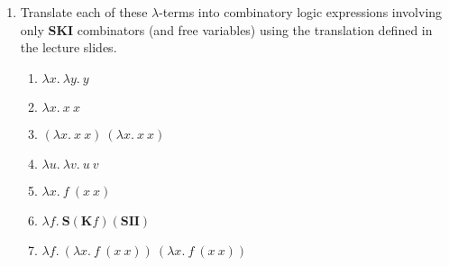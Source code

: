 \documentclass[11pt]{report}
\begin{document}
\begin{enumerate}
\item Translate each of these $\lambda$-terms into combinatory logic expressions involving only \textbf{SKI} combinators (and free variables) using the translation defined in the lecture slides.

	\begin{enumerate}
		\item $\lambda x. \ \lambda y. \ y$
		\item $\lambda x. \ x \ x$
		\item $(\lambda x. \ x \ x) \ (\lambda x. \ x \ x)$
		\item $\lambda u . \ \lambda v. \ u \ v$
		\item $\lambda x. \ f \ (x \ x)$
		\item $\lambda f. \ \textbf{S}(\textbf{K}f)(\textbf{SII})$
		\item $\lambda f. \ (\lambda x. \ f \ (x \ x)) \ (\lambda x. \ f \ (x \ x))$ 	
	\end{enumerate}

	

	 
\end{enumerate}
	
\end{document}
